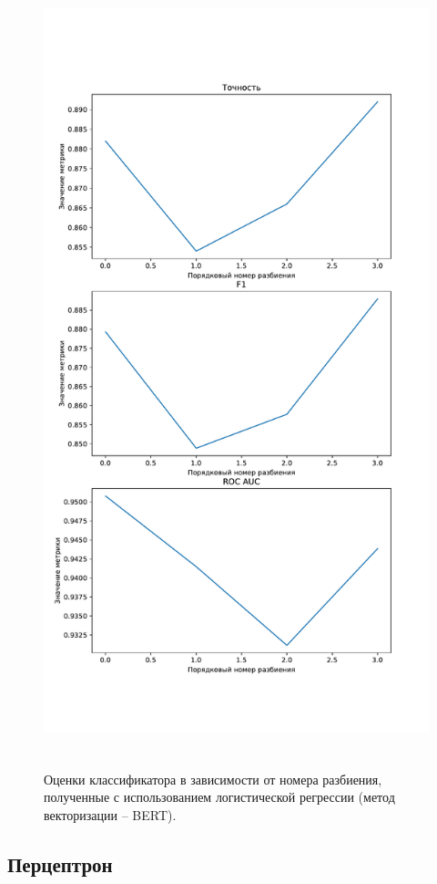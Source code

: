 \begin{figure}[H]
	\centering
	\includegraphics[height=23cm]{inc/plots/logicMetricsBert.pdf}
	\caption{ Оценки классификатора в зависимости от номера разбиения, полученные с использованием логистической регрессии (метод векторизации -- BERT). }
	\label{img:logicMetricsBert}
\end{figure}



\subsection{Перцептрон}


